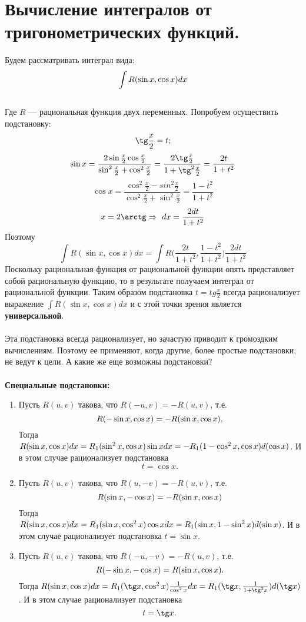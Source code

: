 \section{Вычисление интегралов от тригонометрических функций.}
Будем рассматривать интеграл вида:\\
$$\int R(\sin x, \cos x) dx$$\\
Где $R$ --- рациональная функция двух переменных. 
Попробуем осуществить подстановку:
$$\tg\frac{x}{2}=t;$$
$$\sinx=\frac{2\sin\frac{x}{2}\cos\frac{x}{2}}{\sin^2\frac{x}{2}+\cos^2\frac{x}{2}} = \frac{2\tg\frac{x}{2}}{1+\tg^2\frac{x}{2}} = \frac{2t}{1+t^2}$$
$$\cos x=\frac{\cos^2\frac{x}{2}-sin^2\frac{x}{2}}{\cos^2\frac{x}{2}+\sin^2\frac{x}{2}} = \frac{1-t^2}{1+t^2}$$
$$x = 2\arctg \Rightarrow \ dx = \dfrac{2dt}{1+t^2}  $$
Поэтому $$\int R(\sin x, \cos x) dx = \int R\Big(\frac{2t}{1+t^2}, \frac{1-t^2}{1+t^2}\Big) \frac{2dt}{1+t^2}  $$
Поскольку рациональная функция от рациональной функции опять представляет собой рациональную функцию, то в результате получаем интеграл от рациональной функции. Таким образом подстановка $t=tg\frac{x}{2}$ всегда рационализует выражение $\int R(\sin x, \cos x) dx$ и с этой точки зрения является \textbf{универсальной}.\\\\
Эта подстановка всегда рационализует, но зачастую приводит к громоздким вычислениям. Поэтому ее применяют, когда другие, более простые подстановки, не ведут к цели. А какие же еще возможны подстановки?\\\\
\textbf{Специальные подстановки:}
\begin{enumerate}
	\item Пусть $R(u, v)$ такова, что $R(-u, v) = -R(u, v)$, т.е. $$R(-\sin x, \cos x) = -R(\sin x, \cos x).$$
	Тогда $R(\sin x, \cos x)dx = R_1(\sin^2x, \cos x)\sin xdx = -R_1(1 - \cos^2x, \cos x)d(\cos x)$. И в этом случае рационализует подстановка $$t = \cos x.$$
	\item Пусть $R(u,v)$ такова, что $R(u,-v) = -R(u,v)$, т.е. $$R(\sin x, -\cos x) = -R(\sin x, \cos x)$$
	Тогда $R(\sin x, \cos x)dx = R_1(\sin x, \cos^2x)\cos xdx = R_1(\sin x, 1 - \sin^2x)d(\sin x)$. И в этом случае рационализует подстановка $t = \sin x.$
	\item Пусть $R(u,v)$ такова, что $R(-u, -v) = -R(u,v)$, т.е. $$R(-\sin x, -\cos x) = R(\sin x, \cos x).$$
	Тогда $R(\sinx, \cos x)dx = R_1(\tg x, \cos^2x)\frac{1}{\cos^2x} dx = R_1(\tg x, \frac{1}{1+\tg^2x})d(\tg x)$. И в этом случае рационализует подстановка $$t = \tg x.$$
\end{enumerate}
